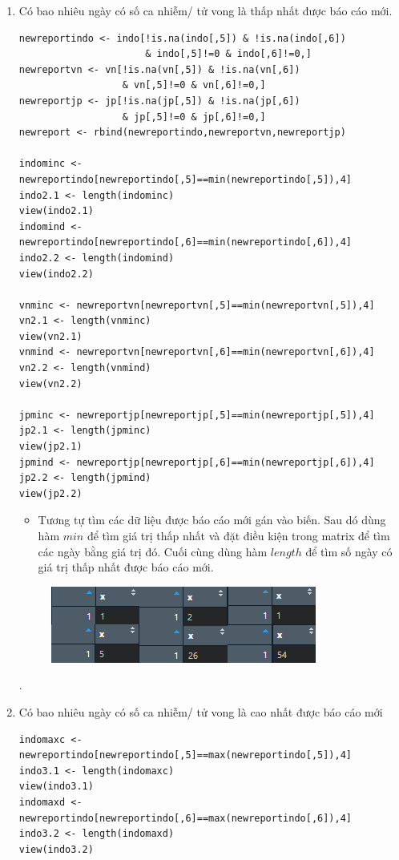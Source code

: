 \documentclass[a4paper]{article}
\theoremstyle{definition}
\begin{document}
\begin{enumerate}[i)]
\begin{enumerate}[1)]
    \item Có bao nhiêu ngày có số ca nhiễm/ tử vong là thấp nhất được báo cáo mới.
    \begin{lstlisting}[frame=single]  
newreportindo <- indo[!is.na(indo[,5]) & !is.na(indo[,6]) 
                      & indo[,5]!=0 & indo[,6]!=0,]
newreportvn <- vn[!is.na(vn[,5]) & !is.na(vn[,6]) 
                  & vn[,5]!=0 & vn[,6]!=0,]
newreportjp <- jp[!is.na(jp[,5]) & !is.na(jp[,6]) 
                  & jp[,5]!=0 & jp[,6]!=0,]
newreport <- rbind(newreportindo,newreportvn,newreportjp)

indominc <- newreportindo[newreportindo[,5]==min(newreportindo[,5]),4]
indo2.1 <- length(indominc)
view(indo2.1)
indomind <- newreportindo[newreportindo[,6]==min(newreportindo[,6]),4] 
indo2.2 <- length(indomind)
view(indo2.2)

vnminc <- newreportvn[newreportvn[,5]==min(newreportvn[,5]),4] 
vn2.1 <- length(vnminc)
view(vn2.1)
vnmind <- newreportvn[newreportvn[,6]==min(newreportvn[,6]),4] 
vn2.2 <- length(vnmind)
view(vn2.2)

jpminc <- newreportjp[newreportjp[,5]==min(newreportjp[,5]),4] 
jp2.1 <- length(jpminc)
view(jp2.1)
jpmind <- newreportjp[newreportjp[,6]==min(newreportjp[,6]),4] 
jp2.2 <- length(jpmind)
view(jp2.2)
	\end{lstlisting}
	\begin{itemize}
	    \item Tương tự tìm các dữ liệu được báo cáo mới gán vào biến. Sau dó dùng hàm $min$ để tìm giá trị thấp nhất và đặt điều kiện trong matrix để tìm các ngày bằng giá trị đó. Cuối cùng dùng hàm $length$ để tìm số ngày có giá trị thấp nhất được báo cáo mới.
	\end{itemize}
	\begin{figure}[h!]
		\begin{center}
		    \includegraphics[scale=1.5]{Images/III/iii2.png}
		\end{center}
	\end{figure}.
    
    \item Có bao nhiêu ngày có số ca nhiễm/ tử vong là cao nhất được báo cáo mới
    \begin{lstlisting}[frame=single]  
indomaxc <- newreportindo[newreportindo[,5]==max(newreportindo[,5]),4] 
indo3.1 <- length(indomaxc)
view(indo3.1)
indomaxd <- newreportindo[newreportindo[,6]==max(newreportindo[,6]),4] 
indo3.2 <- length(indomaxd)
view(indo3.2)


\end{lstlisting}
\end{enumerate}
\end{enumerate}
\end{document}
